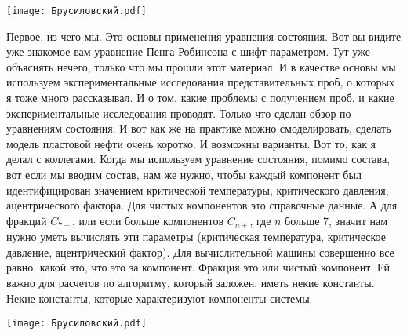\documentclass[main.tex]{subfiles}
\begin{document}
\begin{center}
\texttt{[image: Брусиловский.pdf]}
\end{center}

Первое, из чего мы.
Это основы применения уравнения состояния.
Вот вы видите уже знакомое вам уравнение Пенга-Робинсона с шифт параметром.
Тут уже объяснять нечего, только что мы прошли этот материал.
И в качестве основы мы используем экспериментальные исследования представительных проб, о которых я тоже много рассказывал.
И о том, какие проблемы с получением проб, и какие экспериментальные исследования проводят.
Только что сделан обзор по уравнениям состояния.
И вот как же на практике можно смоделировать, сделать модель пластовой нефти очень коротко.
И возможны варианты.
Вот то, как я делал с коллегами.
Когда мы используем уравнение состояния, помимо состава, вот если мы вводим состав, нам же нужно, чтобы каждый компонент был идентифицирован значением критической температуры, критического давления, ацентрического фактора.
Для чистых компонентов это справочные данные.
А для фракций $C_{7+}$, или если больше компонентов $C_{n+}$, где $n$ больше 7, значит нам нужно уметь вычислять эти параметры (критическая температура, критическое давление, ацентрический фактор).
Для вычислительной машины совершенно все равно, какой это, что это за компонент.
Фракция это или чистый компонент.
Ей важно для расчетов по алгоритму, который заложен, иметь некие константы.
Некие константы, которые характеризуют компоненты системы.

\begin{center}
\texttt{[image: Брусиловский.pdf]}
\end{center}
\end{document}
